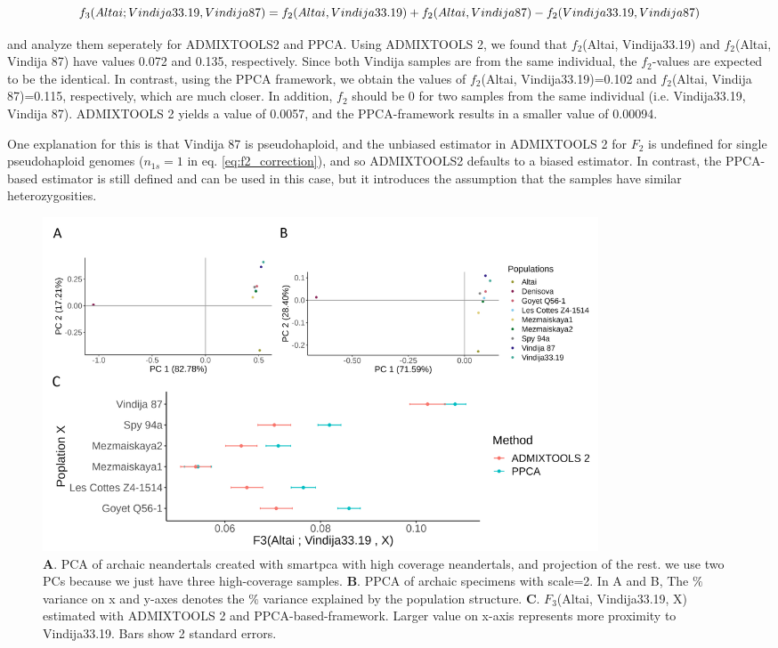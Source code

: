 \documentclass[12pt]{article}
\begin{document}
\begin{dmath}
    f_3(Altai; Vindija33.19, Vindija 87) = f_2(Altai, Vindija33.19) + f_2(Altai, Vindija 87) - f_2(Vindija33.19, Vindija 87)\\
\end{dmath}

and analyze them seperately for ADMIXTOOLS2 and PPCA.
Using ADMIXTOOLS 2, we found that $f_2$(Altai, Vindija33.19) and $f_2$(Altai, Vindija 87) have values 0.072 and 0.135,  respectively. Since both Vindija samples are from the same individual, the $f_2$-values are expected to be the identical. In contrast, using the PPCA framework, we obtain the values of $f_2$(Altai, Vindija33.19)=0.102 and $f_2$(Altai, Vindija 87)=0.115, respectively, which are much closer. In addition, $f_2$ should be 0 for two samples from the same individual (i.e. Vindija33.19, Vindija 87). ADMIXTOOLS 2 yields a value of 0.0057, and the PPCA-framework results in a smaller value of 0.00094. 

One explanation for this is that Vindija 87 is pseudohaploid, and the unbiased estimator in ADMIXTOOLS 2 for $F_2$ is undefined for single pseudohaploid genomes ($n_{1s}=1$ in eq. \ref{eq:f2_correction}), and so ADMIXTOOLS2 defaults to a biased estimator. In contrast, the PPCA-based estimator is still defined and can be used in this case, but it introduces the assumption that the samples have similar heterozygosities. 

\begin{figure}[ht!]
    \includegraphics[width=16.5cm]{Images/ppca/Figures/nea_main.png}
    \centering
    \caption{\textbf{A}. PCA of archaic neandertals created with smartpca with high coverage neandertals, and projection of the rest. we use  two PCs because we just have three high-coverage samples.
    \textbf{B}. PPCA of archaic specimens with scale=2. In A and B, The $\%$ variance on x and y-axes denotes the $\%$ variance explained by the population structure. \textbf{C}. $F_3$(Altai, Vindija33.19, X) estimated with ADMIXTOOLS 2 and PPCA-based-framework. Larger value on x-axis represents more proximity to Vindija33.19. Bars show 2 standard errors.}
    \label{fig:nea_f3}
\end{figure}
\end{document}
